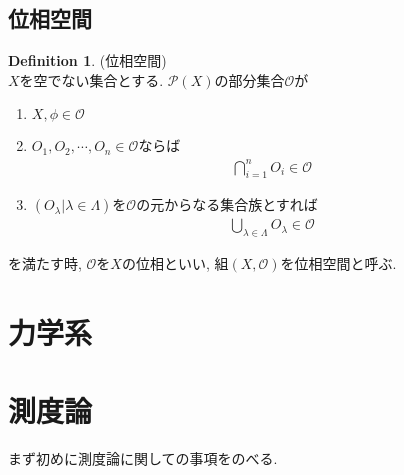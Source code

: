 \documentclass[11pt, a4paper, dvipdfmx]{jsbook}
\theoremstyle{definition}
\newtheorem{Definition+}[Axiom+]{Definition}
\begin{document}
\section{位相空間}
\begin{Definition+}(位相空間)\\
  $X$を空でない集合とする. $\mathcal{P}(X)$の部分集合$\mathscr{O}$が
  \begin{enumerate}
    \item $X,\phi\in\mathscr{O}$ 
    \item $O_{1}, O_{2}, \cdots, O_{n}\in\mathscr{O}$ならば
    \begin{align*}
      \bigcap_{i = 1}^{n} O_{i}\in\mathscr{O}
    \end{align*}
    \item $(O_{\lambda}|\lambda\in\Lambda)$を$\mathscr{O}$の元からなる集合族とすれば
    \begin{align*}
      \bigcup_{\lambda\in\Lambda}O_{\lambda}\in\mathscr{O}
    \end{align*}
  \end{enumerate}
  を満たす時, $\mathscr{O}$を$X$の位相といい, 組$(X, \mathscr{O})$を位相空間と呼ぶ.
\end{Definition+}
\chapter{力学系}

\chapter{測度論}
まず初めに測度論に関しての事項をのべる. 
\end{document}
